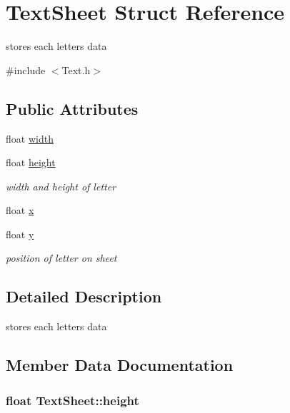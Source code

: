 \hypertarget{struct_text_sheet}{}\section{Text\+Sheet Struct Reference}
\label{struct_text_sheet}


stores each letter\textquotesingle{}s data  




{\ttfamily \#include $<$Text.\+h$>$}

\subsection*{Public Attributes}
\begin{DoxyCompactItemize}
\item 
float \hyperlink{struct_text_sheet_ad6936392d4f6bff5f79288576dc0a0c5}{width}
\item 
float \hyperlink{struct_text_sheet_ac42cf8f9704458dd0bc6e5450e293aaf}{height}
\begin{DoxyCompactList}\small\item\em width and height of letter \end{DoxyCompactList}\item 
float \hyperlink{struct_text_sheet_ad77c30ab829b250b59126699057ef255}{x}
\item 
float \hyperlink{struct_text_sheet_a47c8f71a0888383a2a012aba5c4e492f}{y}
\begin{DoxyCompactList}\small\item\em position of letter on sheet \end{DoxyCompactList}\end{DoxyCompactItemize}


\subsection{Detailed Description}
stores each letter\textquotesingle{}s data 

\subsection{Member Data Documentation}
\hypertarget{struct_text_sheet_ac42cf8f9704458dd0bc6e5450e293aaf}{}
\subsubsection[{height}]{\setlength{\rightskip}{0pt plus 5cm}float Text\+Sheet\+::height}\label{struct_text_sheet_ac42cf8f9704458dd0bc6e5450e293aaf}


